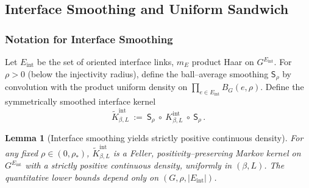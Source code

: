 \documentclass[11pt]{amsart}
\theoremstyle{plain}
\newtheorem{lemma}[theorem]{Lemma}
\theoremstyle{definition}
\theoremstyle{remark}
\begin{document}
\subsection*{Interface Smoothing and Uniform Sandwich}

\subsubsection*{Notation for Interface Smoothing}
Let $E_{\mathrm{int}}$ be the set of oriented interface links, $m_E$ product Haar on $G^{E_{\mathrm{int}}}$. For $\rho>0$ (below the injectivity radius), define the ball–average smoothing $\mathsf S_\rho$ by convolution with the product uniform density on $\prod_{e\in E_{\mathrm{int}}} B_G(e,\rho)$. Define the symmetrically smoothed interface kernel
\[
  \widetilde K_{\beta,L}^{\mathrm{int}}\ :=\ \mathsf S_\rho\ \circ\ K_{\beta,L}^{\mathrm{int}}\ \circ\ \mathsf S_\rho\,.
\]
\begin{lemma}[Interface smoothing yields strictly positive continuous density]\label{lem:interface-smoothing}
For any fixed $\rho\in(0,\rho_\ast)$, $\widetilde K_{\beta,L}^{\mathrm{int}}$ is a Feller, positivity–preserving Markov kernel on $G^{E_{\mathrm{int}}}$ with a strictly positive continuous density, uniformly in $(\beta,L)$. The quantitative lower bounds depend only on $(G,\rho,|E_{\mathrm{int}}|)$.
\end{lemma}
\end{document}
